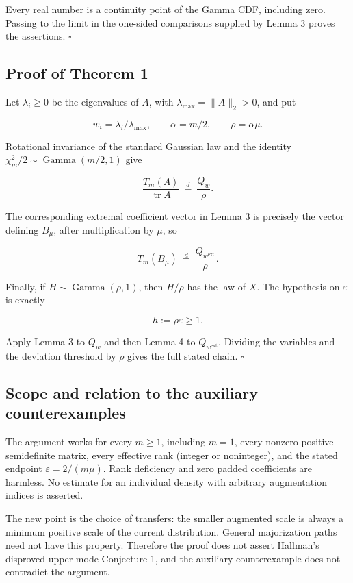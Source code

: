 \documentclass[10pt,a4paper]{article}
\begin{document}
Every real number is a continuity point of the Gamma CDF, including
zero. Passing to the limit in the one-sided comparisons supplied by
Lemma 3 proves the assertions. \(\square\)

\subsection{Proof of Theorem 1}\label{proof-of-theorem-1}

Let \(\lambda_i\ge0\) be the eigenvalues of \(A\), with
\(\lambda_{\max}=\|A\|_2>0\), and put

\[
w_i=\lambda_i/\lambda_{\max},\qquad
\alpha=m/2,\qquad \rho=\alpha\mu.
\]

Rotational invariance of the standard Gaussian law and the identity
\(\chi_m^2/2\sim\operatorname{Gamma}(m/2,1)\) give

\[
\frac{T_m(A)}{\operatorname{tr}A}
\ \stackrel{d}{=}\ \frac{Q_w}{\rho}.
\]

The corresponding extremal coefficient vector in Lemma 3 is precisely
the vector defining \(B_\mu\), after multiplication by \(\mu\), so

\[
T_m(B_\mu)\ \stackrel{d}{=}\ \frac{Q_{w^{\mathrm{ext}}}}{\rho}.
\]

Finally, if \(H\sim\operatorname{Gamma}(\rho,1)\), then \(H/\rho\) has
the law of \(X\). The hypothesis on \(\varepsilon\) is exactly

\[
h:=\rho\varepsilon\ge1.
\]

Apply Lemma 3 to \(Q_w\) and then Lemma 4 to \(Q_{w^{\mathrm{ext}}}\).
Dividing the variables and the deviation threshold by \(\rho\) gives the
full stated chain. \(\square\)

\subsection{Scope and relation to the auxiliary
counterexamples}\label{scope-and-relation-to-the-auxiliary-counterexamples}

The argument works for every \(m\ge1\), including \(m=1\), every nonzero
positive semidefinite matrix, every effective rank (integer or
noninteger), and the stated endpoint \(\varepsilon=2/(m\mu)\). Rank
deficiency and zero padded coefficients are harmless. No estimate for an
individual density with arbitrary augmentation indices is asserted.

The new point is the choice of transfers: the smaller augmented scale is
always a minimum positive scale of the current distribution. General
majorization paths need not have this property. Therefore the proof does
not assert Hallman's disproved upper-mode Conjecture 1, and the
auxiliary counterexample does not contradict the argument.
\end{document}
